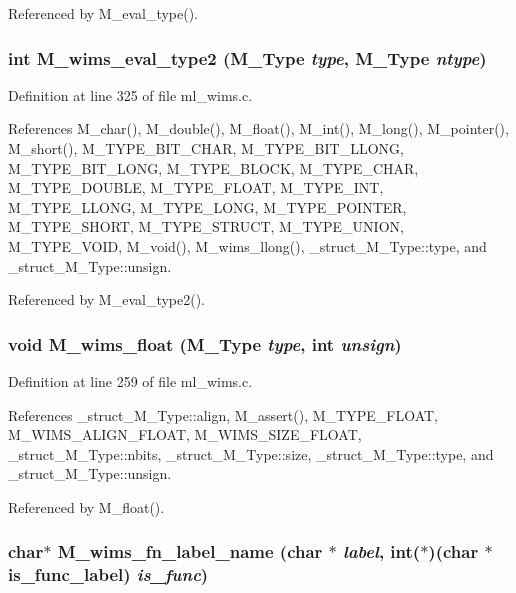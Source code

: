 Referenced by M\_\-eval\_\-type().
\subsubsection{\setlength{\rightskip}{0pt plus 5cm}int M\_\-wims\_\-eval\_\-type2 (\bf{M\_\-Type} {\em type}, \bf{M\_\-Type} {\em ntype})}\label{ml__wims_8c_7542b1f9b6ac532563ad8708df6f87cd}




Definition at line 325 of file ml\_\-wims.c.

References M\_\-char(), M\_\-double(), M\_\-float(), M\_\-int(), M\_\-long(), M\_\-pointer(), M\_\-short(), M\_\-TYPE\_\-BIT\_\-CHAR, M\_\-TYPE\_\-BIT\_\-LLONG, M\_\-TYPE\_\-BIT\_\-LONG, M\_\-TYPE\_\-BLOCK, M\_\-TYPE\_\-CHAR, M\_\-TYPE\_\-DOUBLE, M\_\-TYPE\_\-FLOAT, M\_\-TYPE\_\-INT, M\_\-TYPE\_\-LLONG, M\_\-TYPE\_\-LONG, M\_\-TYPE\_\-POINTER, M\_\-TYPE\_\-SHORT, M\_\-TYPE\_\-STRUCT, M\_\-TYPE\_\-UNION, M\_\-TYPE\_\-VOID, M\_\-void(), M\_\-wims\_\-llong(), \_\-struct\_\-M\_\-Type::type, and \_\-struct\_\-M\_\-Type::unsign.

Referenced by M\_\-eval\_\-type2().
\subsubsection{\setlength{\rightskip}{0pt plus 5cm}void M\_\-wims\_\-float (\bf{M\_\-Type} {\em type}, int {\em unsign})}\label{ml__wims_8c_47e5494bf5c6d5f4fb8a6d0db5852037}




Definition at line 259 of file ml\_\-wims.c.

References \_\-struct\_\-M\_\-Type::align, M\_\-assert(), M\_\-TYPE\_\-FLOAT, M\_\-WIMS\_\-ALIGN\_\-FLOAT, M\_\-WIMS\_\-SIZE\_\-FLOAT, \_\-struct\_\-M\_\-Type::nbits, \_\-struct\_\-M\_\-Type::size, \_\-struct\_\-M\_\-Type::type, and \_\-struct\_\-M\_\-Type::unsign.

Referenced by M\_\-float().
\subsubsection{\setlength{\rightskip}{0pt plus 5cm}char$\ast$ M\_\-wims\_\-fn\_\-label\_\-name (char $\ast$ {\em label}, int($\ast$)(char $\ast$is\_\-func\_\-label) {\em is\_\-func})}\label{ml__wims_8c_8ee362ae84a6f9434982b4e1c837ce73}




